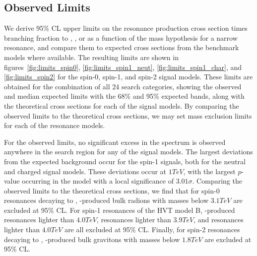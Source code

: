 
\subsection{Observed Limits}

We derive 95\% CL upper limits on the resonance production cross section times branching fraction to \WW, \WZ, or \WH as a function of the mass hypothesis \MX for a narrow resonance, and compare them to expected cross sections from the benchmark models where available.
The resulting limits are shown in figures~\ref{fig:limits_spin0}, \ref{fig:limits_spin1_neut}, \ref{fig:limits_spin1_char}, and \ref{fig:limits_spin2} for the spin-0, spin-1, and spin-2 signal models.
These limits are obtained for the combination of all 24 search categories, showing the observed and median expected limits with the 68\% and 95\% expected bands, along with the theoretical cross sections for each of the signal models.
By comparing the observed limits to the theoretical cross sections, we may set mass exclusion limits for each of the resonance models.

For the observed limits, no significant excess in the \MX spectrum is observed anywhere in the search region for any of the signal models.
The largest deviations from the expected background occur for the \VBF spin-1 signals, both for the neutral and charged signal models.
These deviations occur at $1\unit{TeV}$, with the largest $p$-value occurring in the \VBF\WprtoWZ model with a local significance of $3.01\sigma$.
Comparing the observed limits to the theoretical cross sections, we find that for spin-0 resonances decaying to \WW, \ggF-produced bulk radions with masses below $3.1\unit{TeV}$ are excluded at 95\% CL.
For spin-1 resonances of the HVT model B, \DY-produced \ZprtoWW resonances lighter than $4.0\unit{TeV}$, \WprtoWZ resonances lighter than $3.9\unit{TeV}$, and \WprtoWH resonances lighter than $4.0\unit{TeV}$ are all excluded at 95\% CL.
Finally, for spin-2 resonances decaying to \WW, \ggF-produced bulk gravitons with masses below $1.8\unit{TeV}$ are excluded at 95\% CL.

